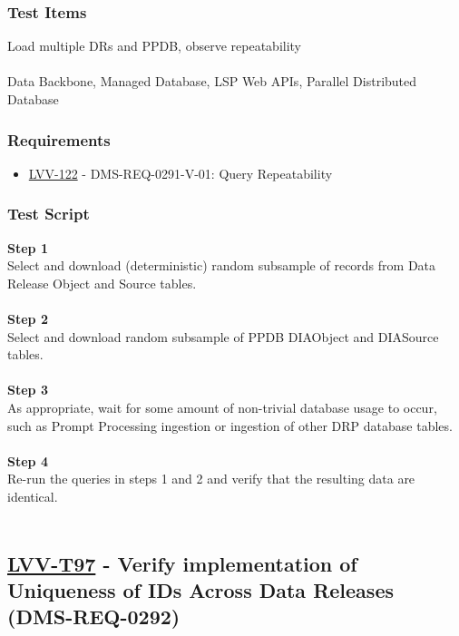 \hypertarget{test-items-72}{%
\subsubsection{Test Items}\label{test-items-72}}

Load multiple DRs and PPDB, observe repeatability\\
~\\
Data Backbone, Managed Database, LSP Web APIs, Parallel Distributed
Database

\hypertarget{requirements-73}{%
\subsubsection{Requirements}\label{requirements-73}}

\begin{itemize}
\tightlist
\item
  \href{https://jira.lsstcorp.org/browse/LVV-122}{LVV-122} -
  DMS-REQ-0291-V-01: Query Repeatability
\end{itemize}

\hypertarget{test-script-73}{%
\subsubsection{Test Script}\label{test-script-73}}

\textbf{Step 1}\\
Select and download (deterministic) random subsample of records from
Data Release Object and Source tables.\\
~\\
\textbf{Step 2}\\
Select and download random subsample of PPDB DIAObject and DIASource
tables.\\
~\\
\textbf{Step 3}\\
As appropriate, wait for some amount of non-trivial database usage to
occur, such as Prompt Processing ingestion or ingestion of other DRP
database tables.\\
~\\
\textbf{Step 4}\\
Re-run the queries in steps 1 and 2 and verify that the resulting data
are identical.\\
~\\

\hypertarget{lvv-t97---verify-implementation-of-uniqueness-of-ids-across-data-releases-dms-req-0292}{%
\subsection{\texorpdfstring{\href{https://jira.lsstcorp.org/secure/Tests.jspa\#/testCase/LVV-T97}{LVV-T97}
- Verify implementation of Uniqueness of IDs Across Data Releases
(DMS-REQ-0292)}{LVV-T97 - Verify implementation of Uniqueness of IDs Across Data Releases (DMS-REQ-0292)}}\label{lvv-t97---verify-implementation-of-uniqueness-of-ids-across-data-releases-dms-req-0292}}

